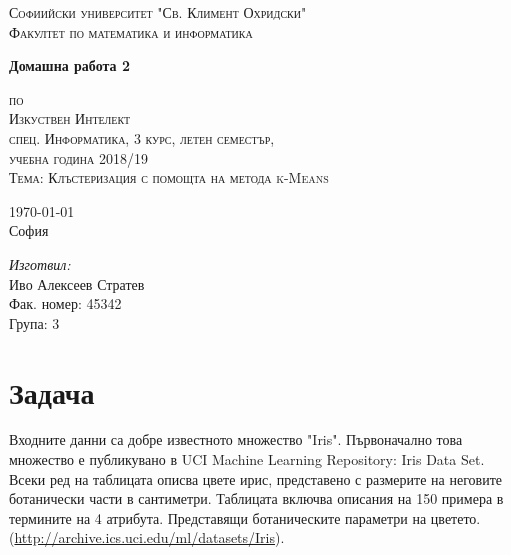 \documentclass[a4paper, 12pt]{article}
\newcommand{\univname}{Софиийски университет "Св. Климент Охридски"\\Факултет по математика и информатика}
\begin{document}
\begin{titlepage}
\begin{center}
    
\vspace*{.06\textheight}
{\scshape\large \univname\par}\vspace{1.5cm}

{\huge \bfseries{Домашна работа 2}\par}\vspace{0.7cm}
\textsc{\small по}\\[0.6cm]
\textsc{\Large Изкуствен Интелект}\\[0.5cm]
\textsc{\normalsize спец. Информатика, 3 курс, летен семестър,}\\[0.5cm]
\textsc{\normalsize учебна година 2018/19}\\[0.6cm]
\textsc{\large Тема: Клъстеризация с помощта на метода k-Means}\\[3cm]
     
\begin{minipage}[t]{0.4\textwidth}
\begin{flushleft} \large
{\large \today}\\[1cm]
София
\end{flushleft}
\end{minipage}
\begin{minipage}[t]{0.4\textwidth}
\begin{flushright} \large
\emph{Изготвил:}\\[0.5cm]
Иво Алексеев Стратев\\[0.5cm]
Фак. номер: 45342\\[0.2cm]
Група: 3
\end{flushright}
\end{minipage}
\end{center}
\end{titlepage}
\tableofcontents
\pagebreak
\section{Задача}
Входните данни са добре известното множество "Iris". Първоначално това множество
е публикувано в UCI Machine Learning Repository: Iris Data Set. Всеки ред на
таблицата описва цвете ирис, представено с размерите на неговите ботанически
части в сантиметри. Таблицата включва описания на 150 примера в термините на 4
атрибута. Представящи ботаническите параметри на цветето.
(\url{http://archive.ics.uci.edu/ml/datasets/Iris}).
\end{document}
